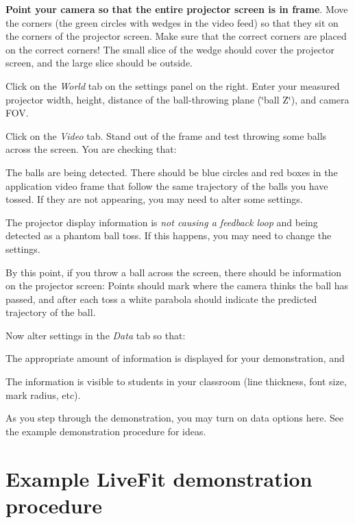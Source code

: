 \begin{DoxyEnumerate}
\item {\bfseries Point your camera so that the entire projector screen is in frame}. Move the corners (the green circles with wedges in the video feed) so that they sit on the corners of the projector screen. Make sure that the correct corners are placed on the correct corners! The small slice of the wedge should cover the projector screen, and the large slice should be outside.
\item Click on the {\itshape World} tab on the settings panel on the right. Enter your measured projector width, height, distance of the ball-\/throwing plane (\char`\"{}ball
   Z\char`\"{}), and camera F\+OV.
\item Click on the {\itshape Video} tab. Stand out of the frame and test throwing some balls across the screen. You are checking that\+:
\begin{DoxyItemize}
\item The balls are being detected. There should be blue circles and red boxes in the application video frame that follow the same trajectory of the balls you have tossed. If they are not appearing, you may need to alter some settings.
\item The projector display information is {\itshape not causing a feedback loop} and being detected as a phantom ball toss. If this happens, you may need to change the settings.
\end{DoxyItemize}
\item By this point, if you throw a ball across the screen, there should be information on the projector screen\+: Points should mark where the camera thinks the ball has passed, and after each toss a white parabola should indicate the predicted trajectory of the ball.
\item Now alter settings in the {\itshape Data} tab so that\+:
\begin{DoxyItemize}
\item The appropriate amount of information is displayed for your demonstration, and
\item The information is visible to students in your classroom (line thickness, font size, mark radius, etc).
\end{DoxyItemize}
\item As you step through the demonstration, you may turn on data options here. See the example demonstration procedure for ideas.
\end{DoxyEnumerate}

\section*{Example Live\+Fit demonstration procedure}

